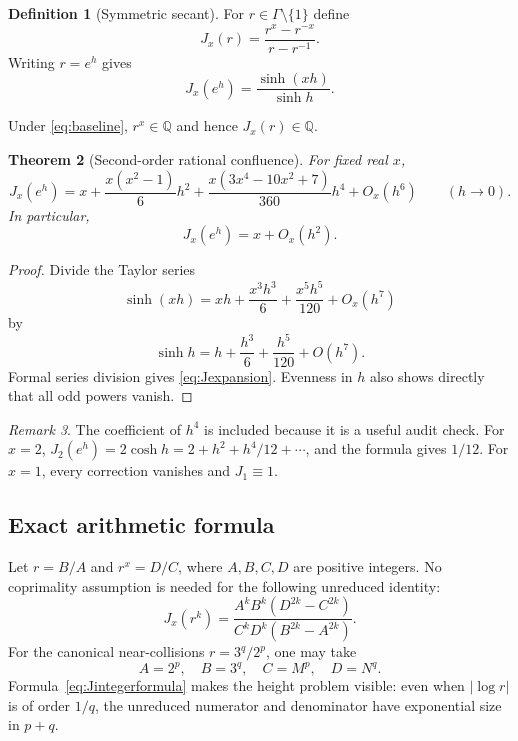 \documentclass[11pt,oneside]{article}
\newtheorem{theorem}{Theorem}[section]
\theoremstyle{definition}
\newtheorem{definition}[theorem]{Definition}
\theoremstyle{remark}
\newtheorem{remark}[theorem]{Remark}
\newcommand{\Q}{\mathbb Q}
\begin{document}
\begin{definition}[Symmetric secant]
For $r\in\Gamma\setminus\{1\}$ define
\begin{equation}
 J_x(r)=\frac{r^x-r^{-x}}{r-r^{-1}}.
 \label{eq:Jdefinition}
\end{equation}
Writing $r=e^h$ gives
\begin{equation}
 J_x(e^h)=\frac{\sinh(xh)}{\sinh h}.
 \label{eq:Jsinh}
\end{equation}
\end{definition}

Under \eqref{eq:baseline}, $r^x\in\Q$ and hence $J_x(r)\in\Q$.

\begin{theorem}[Second-order rational confluence]
\label{thm:secondorder}
For fixed real $x$,
\begin{equation}
 J_x(e^h)
 =x+\frac{x(x^2-1)}6h^2
  +\frac{x(3x^4-10x^2+7)}{360}h^4
  +O_x(h^6)
 \qquad(h\to0).
 \label{eq:Jexpansion}
\end{equation}
In particular,
\begin{equation}
 J_x(e^h)=x+O_x(h^2).
 \label{eq:Jsecondorder}
\end{equation}
\end{theorem}

\begin{proof}
Divide the Taylor series
\[
 \sinh(xh)=xh+\frac{x^3h^3}{6}+\frac{x^5h^5}{120}+O_x(h^7)
\]
by
\[
 \sinh h=h+\frac{h^3}{6}+\frac{h^5}{120}+O(h^7).
\]
Formal series division gives \eqref{eq:Jexpansion}.  Evenness in $h$ also shows directly that
all odd powers vanish.
\end{proof}

\begin{remark}
The coefficient of $h^4$ is included because it is a useful audit check.  For $x=2$,
$J_2(e^h)=2\cosh h=2+h^2+h^4/12+\cdots$, and the formula gives $1/12$.
For $x=1$, every correction vanishes and $J_1\equiv1$.
\end{remark}

\subsection{Exact arithmetic formula}

Let $r=B/A$ and $r^x=D/C$, where $A,B,C,D$ are positive integers.  No coprimality assumption
is needed for the following unreduced identity:
\begin{equation}
 J_x(r^k)
 =\frac{A^kB^k(D^{2k}-C^{2k})}
 {C^kD^k(B^{2k}-A^{2k})}.
 \label{eq:Jintegerformula}
\end{equation}
For the canonical near-collisions $r=3^q/2^p$, one may take
\[
 A=2^p,
 \quad B=3^q,
 \quad C=M^p,
 \quad D=N^q.
\]
Formula~\eqref{eq:Jintegerformula} makes the height problem visible: even when
$|\log r|$ is of order $1/q$, the unreduced numerator and denominator have exponential size in
$p+q$.
\end{document}
